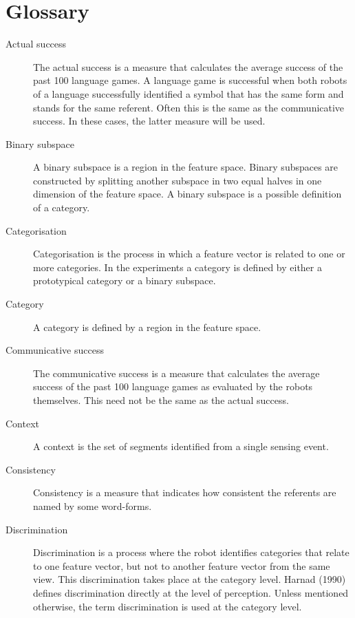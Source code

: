 \chapter{Glossary}

\begin{description}

\item[Actual success] The actual success is a measure that calculates the average success of the past 100 language games. A language game is successful when both robots of a language successfully identified a symbol that has the same form and stands for the same referent. Often this is the same as the communicative success. In these cases, the latter measure will be used.

\item[Binary subspace] A binary subspace is a region in the feature space. Binary subspaces are constructed by splitting another subspace in two equal halves in one dimension of the feature space. A binary subspace is a possible definition of a category.

\item[Categorisation] Categorisation is the process in which a feature vector is related to one or more categories. In the experiments a category is defined by either a prototypical category or a binary subspace.

\item[Category] A category is defined by a region in the feature space.

\item[Communicative success] The communicative success is a measure that calculates the average success of the past 100 language games as evaluated by the robots themselves. This need not be the same as the actual success.

\item[Context] A context is the set of segments identified from a single sensing event.

\item[Consistency] Consistency is a measure that indicates how consistent the referents are named by some word-forms.

\item[Discrimination] Discrimination is a process where the robot identifies categories that relate to one feature vector, but not to another feature vector from the same view. This discrimination takes place at the category level. Harnad (1990) defines discrimination directly at the level of perception. Unless mentioned otherwise, the term discrimination is used at the category level.


\end{description}
